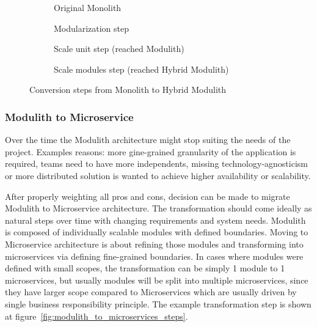 \begin{figure}
    \centering
    \begin{subfigure}{.5\textwidth}
        \centering
        
        \caption{Original Monolith}
    \end{subfigure}%
    \begin{subfigure}{.5\textwidth}
        \centering
        
        \caption{Modularization step}
    \end{subfigure}
    \begin{subfigure}{\textwidth}
        \centering
        
        \caption{Scale unit step (reached Modulith)}
    \end{subfigure}%
    \hfill
    \begin{subfigure}{\textwidth}
        \centering
        
        \caption{Scale modules step (reached Hybrid Modulith)}
    \end{subfigure}
    \caption{Conversion steps from Monolith to Hybrid Modulith}
    \label{fig:monolith_to_modulith_steps}
\end{figure}


\subsubsection{Modulith to Microservice}
Over the time the Modulith architecture might stop suiting the needs of the project. Examples reasons: more gine-grained granularity of the application is required, teams need to have more independents, missing technology-agnosticism or more distributed solution is wanted to achieve higher availability or scalability.

After properly weighting all pros and cons, decision can be made to migrate Modulith to Microservice architecture. The transformation should come ideally as natural steps over time with changing requirements and system needs. Modulith is composed of individually scalable modules with defined boundaries. Moving to Microservice architecture is about refining those modules and transforming into microservices via defining fine-grained boundaries. In cases where modules were defined with small scopes, the transformation can be simply 1 module to 1 microservices, but usually modules will be split into multiple microservices, since they have larger scope compared to Microservices which are usually driven by single business responsibility principle. The example transformation step is shown at figure~\ref{fig:modulith_to_microservices_steps}.

